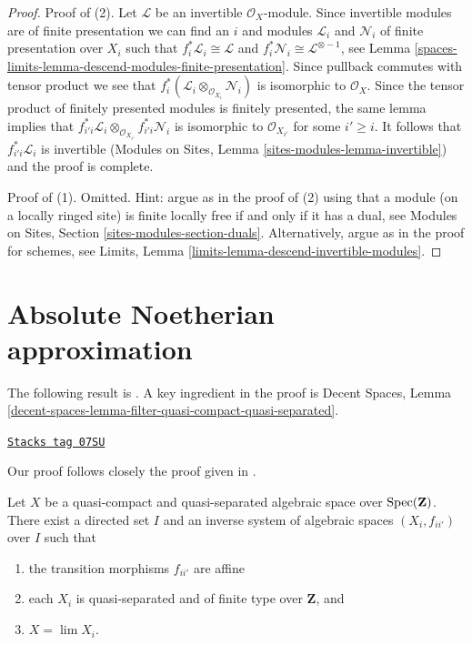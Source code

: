 \begin{proof}
Proof of (2).
Let $\mathcal{L}$ be an invertible $\mathcal{O}_X$-module. Since
invertible modules are of finite presentation we can find an $i$
and modules $\mathcal{L}_i$ and $\mathcal{N}_i$ of finite presentation
over $X_i$ such that $f_i^*\mathcal{L}_i \cong \mathcal{L}$ and
$f_i^*\mathcal{N}_i \cong \mathcal{L}^{\otimes -1}$, see
Lemma \ref{spaces-limits-lemma-descend-modules-finite-presentation}.
Since pullback commutes with tensor product we see that
$f_i^*(\mathcal{L}_i \otimes_{\mathcal{O}_{X_i}} \mathcal{N}_i)$
is isomorphic to $\mathcal{O}_X$. Since the tensor product of
finitely presented modules is finitely presented, the same
lemma implies that
$f_{i'i}^*\mathcal{L}_i
\otimes_{\mathcal{O}_{X_{i'}}} f_{i'i}^*\mathcal{N}_i$
is isomorphic to $\mathcal{O}_{X_{i'}}$ for some $i' \geq i$.
It follows that $f_{i'i}^*\mathcal{L}_i$ is invertible
(Modules on Sites, Lemma \ref{sites-modules-lemma-invertible})
and the proof is complete.

\medskip\noindent
Proof of (1). Omitted. Hint: argue as in the proof of (2)
using that a module (on a locally ringed site) is finite locally free
if and only if it has a dual, see
Modules on Sites, Section \ref{sites-modules-section-duals}.
Alternatively, argue as in the proof for schemes, see
Limits, Lemma \ref{limits-lemma-descend-invertible-modules}.
\end{proof}

\section{Absolute Noetherian approximation}
\label{spaces-limits-section-approximation}
The following result is \cite[Theorem 1.2.2]{CLO}.
A key ingredient in the proof is
Decent Spaces, Lemma
\ref{decent-spaces-lemma-filter-quasi-compact-quasi-separated}.

\begin{proposition}[Approximate]
\label{spaces-limits-proposition-approximate}
\href{https://stacks.math.columbia.edu/tag/07SU}{\texttt{Stacks tag 07SU}}

\begin{reference}
Our proof follows closely the proof given in \cite[Theorem 1.2.2]{CLO}.
\end{reference}
Let $X$ be a quasi-compact and quasi-separated algebraic space over
$\operatorname{Spec}(\mathbf{Z})$. There exist a directed set $I$
and an inverse system of algebraic spaces $(X_i, f_{ii'})$ over $I$
such that
\begin{enumerate}
\item the transition morphisms $f_{ii'}$ are affine
\item each $X_i$ is quasi-separated and of finite type over
$\mathbf{Z}$, and
\item $X = \lim X_i$.
\end{enumerate}
\end{proposition}

